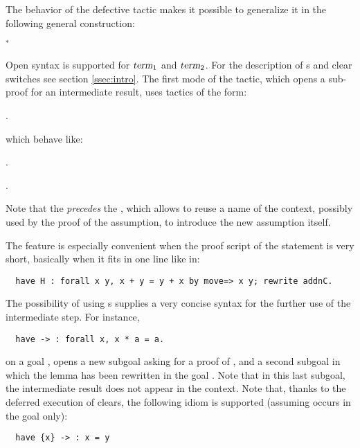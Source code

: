 \noindent{}


The behavior of the defective  tactic makes it possible to
generalize it in the
following general construction:
\begin{center}
         $^*$ 
\end{center}

Open syntax is supported for $\ssrN[1]{term}$ and $\ssrN[2]{term}$. For the
description of
\iitem{}s and clear switches see section \ref{ssec:intro}.
The first mode of the  tactic, which opens a sub-proof for an
intermediate result, uses tactics of the form:

\begin{center}
     \ssrC{:} {\term}  {\tac}.
\end{center}

which behave like:\\

\begin{center}
   {\term}  {\tac}.
\end{center}
\begin{center}
    .
\end{center}


Note that the  \emph{precedes} the
, which allows to reuse a name of the context, possibly used
by the proof of the assumption, to introduce the new assumption
itself.

The  feature is especially convenient when the proof script of the
statement is very short, basically when it fits in one line like in:
\begin{lstlisting}
  have H : forall x y, x + y = y + x by move=> x y; rewrite addnC.
\end{lstlisting}

The possibility of using \iitem{}s supplies a very concise
syntax for the further use of the intermediate step. For instance,
\begin{lstlisting}
  have -> : forall x, x * a = a.
\end{lstlisting}
on a goal , opens a new subgoal asking for a proof of
, and a second subgoal in which the lemma
  has been rewritten in the goal . Note
 that in this last subgoal, the intermediate result does not appear in
 the context.
Note that, thanks to the deferred execution of clears, the following
idiom is supported (assuming  occurs in the goal only):
\begin{lstlisting}
  have {x} -> : x = y
\end{lstlisting}

